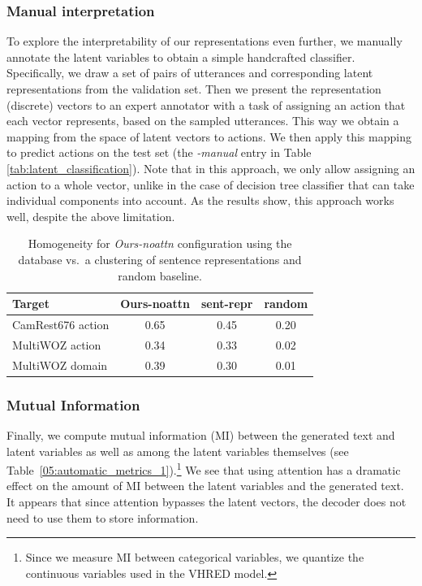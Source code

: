\subsubsection{Manual interpretation}
\label{sec:manual}
To explore the interpretability of our representations even further, we manually annotate the latent variables to obtain a simple handcrafted classifier.
Specifically, we draw a set of pairs of utterances and corresponding latent representations from the validation set.
Then we present the representation (discrete) vectors to an expert annotator with a task of assigning an action that each vector represents, based on the sampled utterances.
This way we obtain a mapping from the space of latent vectors to actions.
We then apply this mapping to predict actions on the test set (the \textit{-manual} entry in Table \ref{tab:latent_classification}).
Note that in this approach, we only allow assigning an action to a whole vector, unlike in the case of decision tree classifier that can take individual components into account.
As the results show, this approach works well, despite the above limitation.

\begin{table}[t]
    \centering\small
    \begin{tabular}{l|c|c|c}
      \toprule
      \textbf{Target} & Ours-noattn & sent-repr & random \\
      \midrule
      CamRest676 action & 0.65 & 0.45 & 0.20\\
      MultiWOZ action & 0.34 & 0.33 & 0.02\\
      MultiWOZ domain & 0.39 & 0.30 & 0.01 \\
      \bottomrule
  \end{tabular}
  \caption{Homogeneity for \emph{Ours-noattn} configuration using the database vs.~a clustering of sentence representations and random baseline.}
  \label{tab:homo}
\end{table}

\subsubsection{Mutual Information}
Finally, we compute mutual information (MI) between the generated text and latent variables as well as among the latent variables themselves (see Table~\ref{05:automatic_metrics_1}).\footnote{
Since we measure MI between categorical variables, we quantize the continuous variables used in the VHRED model.}
We see that using attention has a dramatic effect on the amount of MI between the latent variables and the generated text. %
It appears that since attention bypasses the latent vectors, the decoder does not need to use them to store information.

